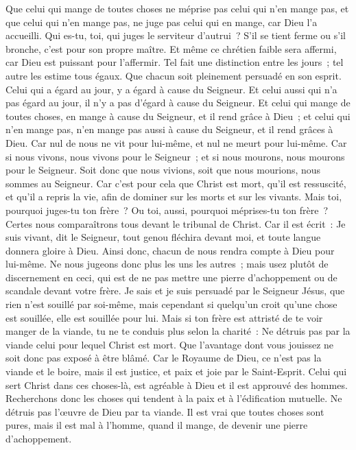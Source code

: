 \begin{multicols}{2}
Que celui qui mange de toutes choses ne méprise pas celui qui n'en mange pas, et que celui qui n'en mange pas, ne juge pas celui qui en mange, car Dieu l'a accueilli.
Qui es-tu, toi, qui juges le serviteur d'autrui~? S'il se tient ferme ou s'il bronche, c'est pour son propre maître. Et même ce chrétien faible sera affermi, car Dieu est puissant pour l'affermir.
Tel fait une distinction entre les jours~; tel autre les estime tous égaux. Que chacun soit pleinement persuadé en son esprit.
Celui qui a égard au jour, y a égard à cause du Seigneur. Et celui aussi qui n'a pas égard au jour, il n'y a pas d'égard à cause du Seigneur. Et celui qui mange de toutes choses, en mange à cause du Seigneur, et il rend grâce à Dieu~; et celui qui n'en mange pas, n'en mange pas aussi à cause du Seigneur, et il rend grâces à Dieu.
Car nul de nous ne vit pour lui-même, et nul ne meurt pour lui-même.
Car si nous vivons, nous vivons pour le Seigneur~; et si nous mourons, nous mourons pour le Seigneur. Soit donc que nous vivions, soit que nous mourions, nous sommes au Seigneur.
Car c'est pour cela que Christ est mort, qu'il est ressuscité, et qu'il a repris la vie, afin de dominer sur les morts et sur les vivants.
Mais toi, pourquoi juges-tu ton frère~? Ou toi, aussi, pourquoi méprises-tu ton frère~? Certes nous comparaîtrons tous devant le tribunal de Christ.
Car il est écrit~: Je suis vivant, dit le Seigneur, tout genou fléchira devant moi, et toute langue donnera gloire à Dieu.
 Ainsi donc, chacun de nous rendra compte à Dieu pour lui-même.
Ne nous jugeons donc plus les uns les autres~; mais usez plutôt de discernement en ceci, qui est de ne pas mettre une pierre d'achoppement ou de scandale devant votre frère.
Je sais et je suis persuadé par le Seigneur Jésus, que rien n'est souillé par soi-même, mais cependant si quelqu'un croit qu'une chose est souillée, elle est souillée pour lui.
Mais si ton frère est attristé de te voir manger de la viande, tu ne te conduis plus selon la charité~: Ne détruis pas par la viande celui pour lequel Christ est mort.
Que l'avantage dont vous jouissez ne soit donc pas exposé à être blâmé.
Car le Royaume de Dieu, ce n'est pas la viande et le boire, mais il est justice, et paix et joie par le Saint-Esprit.
Celui qui sert Christ dans ces choses-là, est agréable à Dieu et il est approuvé des hommes.
Recherchons donc les choses qui tendent à la paix et à l'édification mutuelle.
Ne détruis pas l'œuvre de Dieu par ta viande. Il est vrai que toutes choses sont pures, mais il est mal à l'homme, quand il mange, de devenir une pierre d'achoppement.

\end{multicols}
